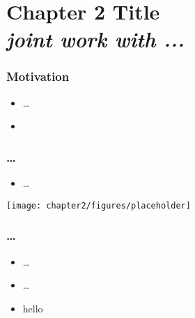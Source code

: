 
\section{Chapter 2 Title\\ \textit{\textmd{joint work with ...}}}
\label{chapter2}

\begin{frame}[t]\frametitle{Motivation}
    \begin{itemize}[<+->]
        \item \ldots
        \item \cite{Abbring2007}
    \end{itemize}
    \vfill
    \hyperlink{backup_2}{}
\end{frame}

\begin{frame}\frametitle{\ldots}
    \begin{itemize}
        \item \ldots
    \end{itemize}
    \begin{center}
        \texttt{[image: chapter2/figures/placeholder]}
    \end{center}
\end{frame}

\begin{frame}[t]
    \frametitle{\ldots}
    \begin{itemize}
        \item<1-> \ldots
        \item<2->[$\Rightarrow$] \ldots \vspace{1em}
        \item<3-> hello 
    \end{itemize}
\end{frame}
